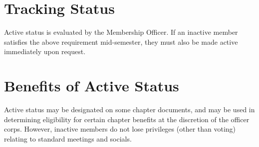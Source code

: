 \section{Tracking Status}  Active status is evaluated by the Membership Officer.  If an inactive member satisfies the above requirement mid-semester, they must also be made active immediately upon request.  

\section{Benefits of Active Status}  Active status may be designated on some chapter documents, and may be used in determining eligibility for certain chapter benefits at the discretion of the officer corps.  However, inactive members do not lose privileges (other than voting) relating to standard meetings and socials.